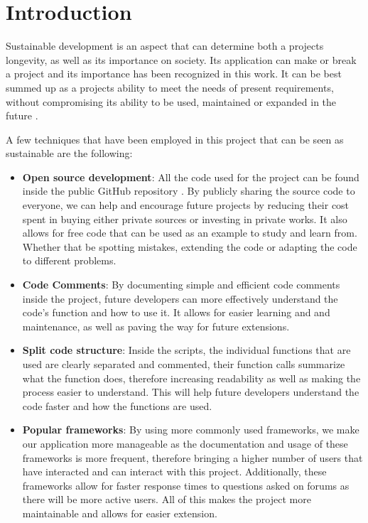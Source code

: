 
\section{Introduction}
Sustainable development is an aspect that can determine both a projects longevity, as well as its importance on society. Its application can make or break a project and its importance has been recognized in this work. It can be best summed up as a projects ability to meet the needs of present requirements, without compromising its ability to be used, maintained or expanded in the future \cite{iisd:susDev}.

A few techniques that have been employed in this project that can be seen as sustainable are the following:
\begin{itemize}
    \item \textbf{Open source development}: All the code used for the project can be found inside the public GitHub repository \cite{github:repo}. By publicly sharing the source code to everyone, we can help and encourage future projects by reducing their cost spent in buying either private sources or investing in private works. It also allows for free code that can be used as an example to study and learn from. Whether that be spotting mistakes, extending the code or adapting the code to different problems.
    \item \textbf{Code Comments}: By documenting simple and efficient code comments inside the project, future developers can more effectively understand the code's function and how to use it. It allows for easier learning and and maintenance, as well as paving the way for future extensions.
    \item \textbf{Split code structure}: Inside the scripts, the individual functions that are used are clearly separated and commented, their function calls summarize what the function does, therefore increasing readability as well as making the process easier to understand. This will help future developers understand the code faster and how the functions are used.
    \item \textbf{Popular frameworks}: By using more commonly used frameworks, we make our application more manageable as the documentation and usage of these frameworks is more frequent, therefore bringing a higher number of users that have interacted and can interact with this project. Additionally, these frameworks allow for faster response times to questions asked on forums as there will be more active users. All of this makes the project more maintainable and allows for easier extension.

\end{itemize}
